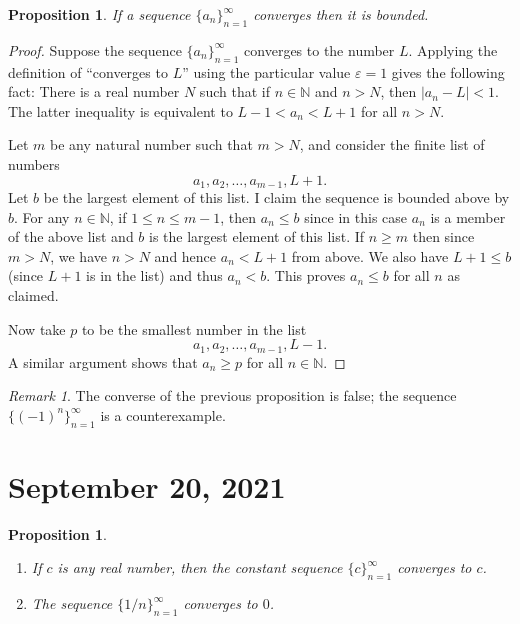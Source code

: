 \documentclass[12pt]{amsart}
\def\e{\varepsilon}
\newcommand{\N}{\mathbb{N}}
\numberwithin{equation}{section}
\theoremstyle{plain} %
\newtheorem{prop}[equation]{Proposition}
\newcommand{\Sept}[1]{\section{September #1, 2021}}
\theoremstyle{definition}
\theoremstyle{remark}
\newtheorem{rem}[equation]{Remark}
\begin{document}
\begin{prop} \label{prop21}
	If a sequence $\{a_n\}_{n=1}^\infty$ converges then it is bounded.
\end{prop}

\begin{proof} Suppose the sequence $\{a_n\}_{n=1}^\infty$ converges to
	the number $L$. Applying the definition of ``converges to $L$'' using the particular value $\e = 1$ gives the following fact:
	There is a real number $N$ such that if $n \in \N$ and $n > N$, then $|a_n -
	L| < 1$. The latter inequality is equivalent to  $L-1 < a_n < L+1$
	for all $n > N$.
	
	Let $m$ be any natural number such that $m > N$,
	and consider the finite list of numbers
	$$
	a_1, a_2, \dots, a_{m-1}, L + 1.
	$$
	Let $b$ be the largest element of this list. I claim the sequence is bounded above by $b$.
	For any $n \in  \N$, if $1 \leq n \leq m-1$, then $a_n \leq b$ since in this case $a_n$ is a member of the above list and $b$ is the largest element of this list.
	If $n \geq m$ then since $m > N$, we have $n > N$ and hence $a_n < L + 1$ from above. We also have $L + 1 \leq b$ (since $L+1$ is in the list) and thus $a_n < b$. 
	This proves $a_n \leq b$ for all $n$ as claimed.
	
	Now take $p$ to be the smallest number in the list
	$$
	a_1, a_2, \dots, a_{m-1}, L - 1.
	$$
	A similar argument shows that $a_n \geq p$ for all $n \in \N$.
\end{proof}


\begin{rem}
The converse of the previous proposition is false; the sequence $\{(-1)^n\}_{n=1}^\infty$ is a counterexample.
\end{rem}



\Sept{20}

\begin{prop}\begin{enumerate}
\item If $c$ is any real number, then the constant sequence $\{ c\}_{n=1}^{\infty}$ converges to $c$.
\item The sequence $\{1/n\}_{n=1}^\infty$ converges to $0$.
\end{enumerate}
\end{prop}
\end{document}
